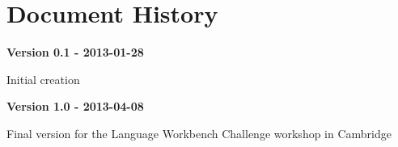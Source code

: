 \newpage
\section*{Document History}

\textbf {Version 0.1 - 2013-01-28}
\begin{compactitem}
\item Initial creation \\
\end{compactitem}

\textbf {Version 1.0 - 2013-04-08}
\begin{compactitem}
\item Final version for the Language Workbench Challenge workshop in Cambridge
\\
\end{compactitem}
